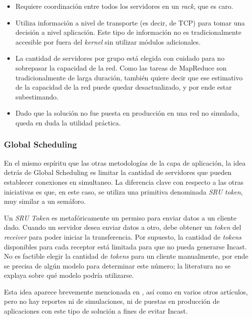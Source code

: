 \documentclass[runningheads,a4paper]{llncs}
\begin{document}
\begin{itemize}
    \item Requiere coordinación entre todos los servidores en un \textit{rack}, que es caro.
    
    \item Utiliza información a nivel de transporte (es decir, de TCP) para tomar una decisión a nivel aplicación. Este tipo de información no es tradicionalmente accesible por fuera del \textit{kernel} sin utilizar módulos adicionales. 
    
    \item La cantidad de servidores por grupo está elegida con cuidado para no sobrepasar la capacidad de la red. Como las tareas de MapReduce son tradicionalmente de larga duración, también quiere decir que ese estimativo de la capacidad de la red puede quedar desactualizado, y por ende estar subestimando.
    
    \item Dado que la solución no fue puesta en producción en una red no simulada, queda en duda la utilidad práctica.
\end{itemize}

\subsubsection{Global Scheduling}

En el mismo espíritu que las otras metodologías de la capa de aplicación, la idea detrás de Global Scheduling es limitar la cantidad de servidores que pueden establecer conexiones en simultaneo. La diferencia clave con respecto a las otras iniciativas es que, en este caso, se utiliza una primitiva denominada \textit{SRU token}, muy similar a un semáforo.

Un \textit{SRU Token} es metafóricamente un permiso para enviar datos a un cliente dado. Cuando un servidor desea enviar datos a otro, debe obtener un \textit{token} del \textit{receiver} para poder iniciar la transferencia. Por supuesto, la cantidad de \textit{tokens} disponibles para cada receptor está limitada para que no pueda generarse Incast. No es factible elegir la cantidad de \textit{tokens} para un cliente manualmente, por ende se precisa de algún modelo para determinar este número; la literatura no se explaya sobre qué modelo podría utilizarse.

Esta idea aparece brevemente mencionada en \cite{Krevat_ApplicationLevelApproaches_2007}, así como en varios otros artículos, pero no hay reportes ni de simulaciones, ni de puestas en producción de aplicaciones con este tipo de solución a fines de evitar Incast.
\end{document}
